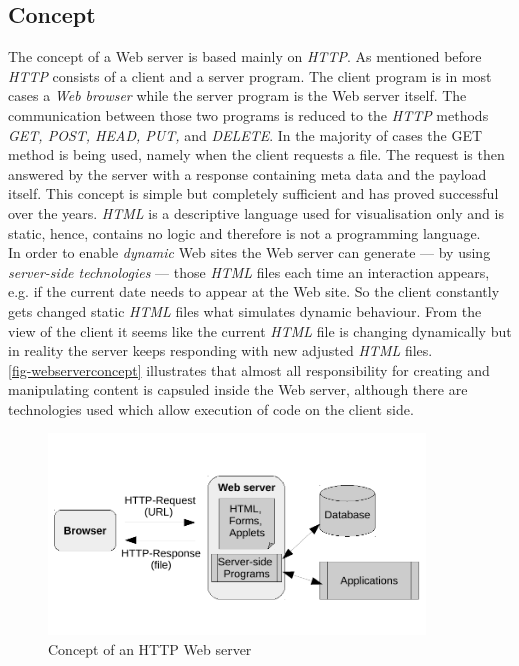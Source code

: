 \documentclass[
  a4paper,               %
  twoside,               %
  headings=small,        %
  DIV=12,                %
  BCOR=1cm,              %
  headinclude=true,      %
  footinclude=true,      %
  numbers=noenddot,      %
  11pt]{scrartcl}        %
\begin{document}
\subsection{Concept}
The concept of a Web server is based mainly on \textit{HTTP}. As mentioned before \textit{HTTP} consists of a client and a server program. The client program is in most cases a \textit{Web browser} while the server program is the Web server itself. The communication between those two programs is reduced to the \textit{HTTP} methods \emph{GET, POST, HEAD, PUT,} and \emph{DELETE}. In the majority of cases the GET method is being used, namely when the client requests a file. The request is then answered by the server with a response containing meta data and the payload itself. This concept is simple but completely sufficient and has proved successful over the years. \textit{HTML} is a descriptive language used for visualisation only and is static, hence, contains no logic and therefore is not a programming language.\\
In order to enable \textit{dynamic} Web sites the Web server can generate --- by using \textit{server-side technologies} --- those \textit{HTML} files each time an interaction appears, e.g. if the current date needs to appear at the Web site. So the client constantly gets changed static \textit{HTML} files what simulates dynamic behaviour. From the view of the client it seems like the current \textit{HTML} file is changing dynamically but in reality the server keeps responding with new adjusted \textit{HTML} files.\\
\autoref{fig-webserverconcept} illustrates  that almost all responsibility for creating and manipulating content is capsuled inside the Web server, although there are technologies used which allow execution of code on the client side. 

\begin{figure}[h]
  \centerline{\includegraphics[width=10cm]{pics/webclient.pdf}}
  \caption{Concept of an HTTP Web server}
  \label{fig-webserverconcept}
\end{figure}
\end{document}
